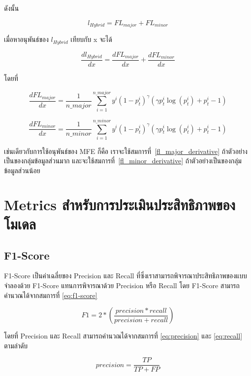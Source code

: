 ดังนั้น

\begin{equation}
    l_{Hybrid} = FL_{major} + FL_{minor}
\end{equation}

เมื่อหาอนุพันธ์ของ $l_{Hybrid}$ เทียบกับ x จะได้

\begin{equation}
\frac{dl_{Hybrid}}{dx} = \frac{dFL_{major}}{dx} + \frac{dFL_{minor}}{dx}
\end{equation}

โดยที่

\begin{equation} \label{fl_major_derivative}
\frac{dFL_{major}}{dx} = \frac{1}{n\_major} \sum_{i = 1}^{n\_major} y^{i} (1 - p_{t}^{i})^{\gamma} (\gamma p_{t}^{i} \log (p_{t}^{i}) + p_{t}^{i} - 1)
\end{equation}

\begin{equation} \label{fl_minor_derivative}
\frac{dFL_{minor}}{dx} = \frac{1}{n\_minor} \sum_{i = 1}^{n\_minor} y^{i} (1 - p_{t}^{i})^{\gamma} (\gamma p_{t}^{i} \log (p_{t}^{i}) + p_{t}^{i} - 1)
\end{equation}

เช่นเดียวกับการใช้อนุพันธ์ของ MFE ก็คือ เราจะใช้สมการที่~\ref{fl_major_derivative} ถ้าตัวอย่างเป็นของกลุ่มข้อมูลส่วนมาก และจะใช้สมการที่~\ref{fl_minor_derivative} ถ้าตัวอย่างเป็นของกลุ่มข้อมูลส่วนน้อย

\section{Metrics สำหรับการประเมินประสิทธิภาพของโมเดล}
\subsection{F1-Score}
F1-Score เป็นค่าเฉลี่ยของ Precision และ Recall ที่ซึ่งเราสามารถพิจารณาประสิทธิภาพของแบบจำลองด้วย F1-Score แทนการพิจารณาด้วย Precision หรือ Recall โดย F1-Score สามารถคำนวณได้จากสมการที่ \ref{eq:f1-score}

\begin{equation}
  F1 = 2 * \left ( \frac{precision * recall}{precision + recall} \right )
  \label{eq:f1-score}
\end{equation}

โดยที่ Precision และ Recall สามารถคำนวณได้จากสมการที่ \ref{eq:precision} และ \ref{eq:recall} ตามลำดับ

\begin{equation}
  precision = \frac{TP}{TP + FP}
  \label{eq:precision}
\end{equation}


